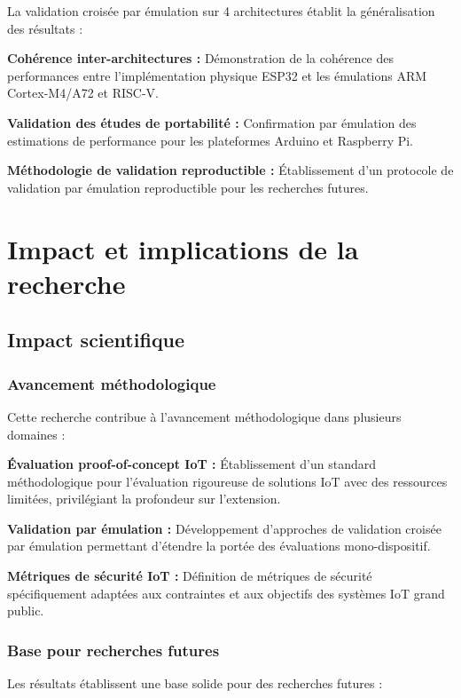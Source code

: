 La validation croisée par émulation sur 4 architectures établit la généralisation des résultats :

\textbf{Cohérence inter-architectures :} Démonstration de la cohérence des performances entre l'implémentation physique ESP32 et les émulations ARM Cortex-M4/A72 et RISC-V.

\textbf{Validation des études de portabilité :} Confirmation par émulation des estimations de performance pour les plateformes Arduino et Raspberry Pi.

\textbf{Méthodologie de validation reproductible :} Établissement d'un protocole de validation par émulation reproductible pour les recherches futures.

\section{Impact et implications de la recherche}

\subsection{Impact scientifique}

\subsubsection{Avancement méthodologique}

Cette recherche contribue à l'avancement méthodologique dans plusieurs domaines :

\textbf{Évaluation proof-of-concept IoT :} Établissement d'un standard méthodologique pour l'évaluation rigoureuse de solutions IoT avec des ressources limitées, privilégiant la profondeur sur l'extension.

\textbf{Validation par émulation :} Développement d'approches de validation croisée par émulation permettant d'étendre la portée des évaluations mono-dispositif.

\textbf{Métriques de sécurité IoT :} Définition de métriques de sécurité spécifiquement adaptées aux contraintes et aux objectifs des systèmes IoT grand public.

\subsubsection{Base pour recherches futures}

Les résultats établissent une base solide pour des recherches futures :

